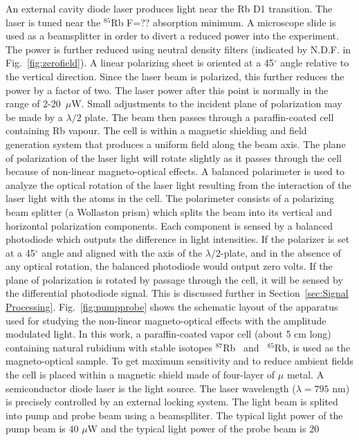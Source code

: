   An external cavity diode laser produces light near the Rb D1 transition.  The laser is tuned near the $^{85}$Rb F=?? absorption minimum.  A microscope slide is used as a beamsplitter in order to divert a reduced power into the experiment.  The power is further reduced using neutral density filters (indicated by N.D.F. in Fig.~\ref{fig:zerofield}).  A linear polarizing sheet is oriented at a 45$^\circ$ angle relative to the vertical direction.  Since the laser
beam is polarized, this further reduces the power by a factor of two. The laser power after this point is normally in the range of 2-20~$\mu$W.  Small adjustments to the incident plane of polarization may be made by a $\lambda/2$ plate.  The beam then passes through a paraffin-coated cell containing Rb vapour.  The cell is within a
magnetic shielding and field generation system that produces a uniform field along the beam axis.  The plane of polarization of the laser
light will rotate slightly as it passes through the cell because of
non-linear magneto-optical effects.  A balanced polarimeter is used to
analyze the optical rotation of the laser light resulting from the
interaction of the laser light with the atoms in the cell.  The
polarimeter consists of a polarizing beam splitter (a Wollaston prism)
which splits the beam into its vertical and horizontal polarization
components.  Each component is sensed by a balanced photodiode which
outputs the difference in light intensities.  If the polarizer is set
at a 45$^\circ$ angle and aligned with the axis of the
$\lambda/2$-plate, and in the absence of any optical rotation, the
balanced photodiode would output zero volts.  If the plane of
polarization is rotated by passage through the cell, it will be sensed
by the differential photodiode signal.  This is discussed further in Section~\ref{sec:Signal Processing}. Fig.~\ref{fig:pumpprobe}  shows the schematic layout of the apparatus used for studying the
non-linear magneto-optical effects with the amplitude modulated
light. In this work, a paraffin-coated vapor cell (about 5 cm long)
containing natural rubidium with stable isotopes $^{87}$Rb~ and~
$^{85}$Rb, is used as the magneto-optical sample. To get maximum
sensitivity and to reduce ambient fields the cell is placed within a
magnetic shield made of four-layer of $\mu$ metal. A semiconductor diode laser is the light source. The laser
wavelength ($\lambda=795$ nm) is precisely controlled by an external
locking system.  The light beam is splited into pump and
probe beam using a beamsplliter. The typical light power of the pump
beam is 40 $\mu$W and the typical light power of the probe beam is 20
